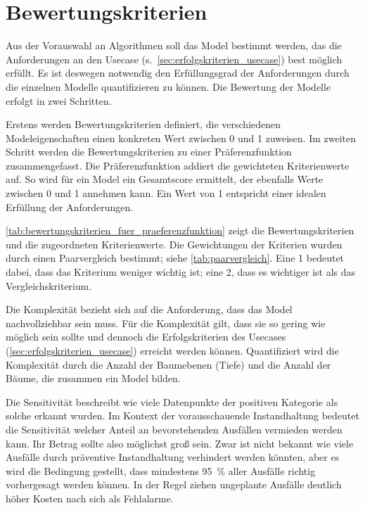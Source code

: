 \section{Bewertungskriterien}
\label{sec:bewertungskriterien}
Aus der Vorauswahl an Algorithmen soll das Model bestimmt werden, das die Anforderungen an den Usecase (s.~\cref{sec:erfolgskriterien_usecase}) best möglich erfüllt. Es ist deswegen notwendig den Erfüllungsgrad der Anforderungen durch die einzelnen Modelle quantifizieren zu können. Die Bewertung der Modelle erfolgt in zwei Schritten.

Erstens werden Bewertungskriterien definiert, die verschiedenen Modeleigenschaften einen konkreten Wert zwischen \num{0} und \num{1} zuweisen. Im zweiten Schritt werden die Bewertungskriterien zu einer Präferenzfunktion zusammengefasst. Die Präferenzfunktion addiert die gewichteten Kriterienwerte auf. So wird für ein Model ein Gesamtscore ermittelt, der ebenfalls Werte zwischen \num{0} und \num{1} annehmen kann. Ein Wert von \num{1} entspricht einer idealen Erfüllung der Anforderungen.

\cref{tab:bewertungskriterien_fuer_praeferenzfunktion} zeigt die Bewertungskriterien und die zugeordneten Kriterienwerte. Die Gewichtungen der Kriterien wurden durch einen Paarvergleich bestimmt; siehe \cref{tab:paarvergleich}. Eine \num{1} bedeutet dabei, dass das Kriterium weniger wichtig ist; eine \num{2}, dass es wichtiger ist als das Vergleichskriterium.

Die Komplexität bezieht sich auf die Anforderung, dass das Model nachvollziehbar sein muss. Für die Komplexität gilt, dass sie so gering wie möglich sein sollte und dennoch die Erfolgskriterien des Usecases (\cref{sec:erfolgskriterien_usecase}) erreicht werden können. Quantifiziert wird die Komplexität durch die Anzahl der Baumebenen (Tiefe) und die Anzahl der Bäume, die zusammen ein Model bilden.

Die Sensitivität beschreibt wie viele Datenpunkte der positiven Kategorie als solche erkannt wurden. Im Kontext der vorausschauende Instandhaltung bedeutet die Sensitivität welcher Anteil an bevorstehenden Ausfällen vermieden werden kann. Ihr Betrag sollte also möglichst groß sein. Zwar ist nicht bekannt wie viele Ausfälle durch präventive Instandhaltung verhindert werden könnten, aber es wird die Bedingung gestellt, dass mindestens \SI{95}{\percent} aller Ausfälle richtig vorhergesagt werden können. In der Regel ziehen ungeplante Ausfälle deutlich höher Kosten nach sich als Fehlalarme.

